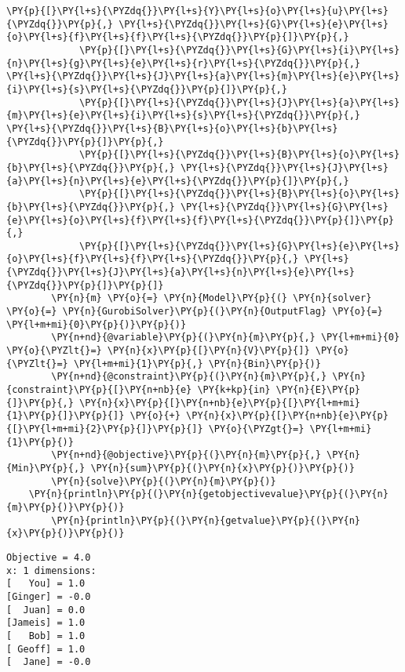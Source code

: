 \begin{Verbatim}[commandchars=\\\{\}]
             \PY{p}{[}\PY{l+s}{\PYZdq{}}\PY{l+s}{Y}\PY{l+s}{o}\PY{l+s}{u}\PY{l+s}{\PYZdq{}}\PY{p}{,} \PY{l+s}{\PYZdq{}}\PY{l+s}{G}\PY{l+s}{e}\PY{l+s}{o}\PY{l+s}{f}\PY{l+s}{f}\PY{l+s}{\PYZdq{}}\PY{p}{]}\PY{p}{,}
             \PY{p}{[}\PY{l+s}{\PYZdq{}}\PY{l+s}{G}\PY{l+s}{i}\PY{l+s}{n}\PY{l+s}{g}\PY{l+s}{e}\PY{l+s}{r}\PY{l+s}{\PYZdq{}}\PY{p}{,} \PY{l+s}{\PYZdq{}}\PY{l+s}{J}\PY{l+s}{a}\PY{l+s}{m}\PY{l+s}{e}\PY{l+s}{i}\PY{l+s}{s}\PY{l+s}{\PYZdq{}}\PY{p}{]}\PY{p}{,}
             \PY{p}{[}\PY{l+s}{\PYZdq{}}\PY{l+s}{J}\PY{l+s}{a}\PY{l+s}{m}\PY{l+s}{e}\PY{l+s}{i}\PY{l+s}{s}\PY{l+s}{\PYZdq{}}\PY{p}{,} \PY{l+s}{\PYZdq{}}\PY{l+s}{B}\PY{l+s}{o}\PY{l+s}{b}\PY{l+s}{\PYZdq{}}\PY{p}{]}\PY{p}{,}
             \PY{p}{[}\PY{l+s}{\PYZdq{}}\PY{l+s}{B}\PY{l+s}{o}\PY{l+s}{b}\PY{l+s}{\PYZdq{}}\PY{p}{,} \PY{l+s}{\PYZdq{}}\PY{l+s}{J}\PY{l+s}{a}\PY{l+s}{n}\PY{l+s}{e}\PY{l+s}{\PYZdq{}}\PY{p}{]}\PY{p}{,}
             \PY{p}{[}\PY{l+s}{\PYZdq{}}\PY{l+s}{B}\PY{l+s}{o}\PY{l+s}{b}\PY{l+s}{\PYZdq{}}\PY{p}{,} \PY{l+s}{\PYZdq{}}\PY{l+s}{G}\PY{l+s}{e}\PY{l+s}{o}\PY{l+s}{f}\PY{l+s}{f}\PY{l+s}{\PYZdq{}}\PY{p}{]}\PY{p}{,}
             \PY{p}{[}\PY{l+s}{\PYZdq{}}\PY{l+s}{G}\PY{l+s}{e}\PY{l+s}{o}\PY{l+s}{f}\PY{l+s}{f}\PY{l+s}{\PYZdq{}}\PY{p}{,} \PY{l+s}{\PYZdq{}}\PY{l+s}{J}\PY{l+s}{a}\PY{l+s}{n}\PY{l+s}{e}\PY{l+s}{\PYZdq{}}\PY{p}{]}\PY{p}{]}
        \PY{n}{m} \PY{o}{=} \PY{n}{Model}\PY{p}{(} \PY{n}{solver} \PY{o}{=} \PY{n}{GurobiSolver}\PY{p}{(}\PY{n}{OutputFlag} \PY{o}{=} \PY{l+m+mi}{0}\PY{p}{)}\PY{p}{)}
        \PY{n+nd}{@variable}\PY{p}{(}\PY{n}{m}\PY{p}{,} \PY{l+m+mi}{0} \PY{o}{\PYZlt{}=} \PY{n}{x}\PY{p}{[}\PY{n}{V}\PY{p}{]} \PY{o}{\PYZlt{}=} \PY{l+m+mi}{1}\PY{p}{,} \PY{n}{Bin}\PY{p}{)}
        \PY{n+nd}{@constraint}\PY{p}{(}\PY{n}{m}\PY{p}{,} \PY{n}{constraint}\PY{p}{[}\PY{n+nb}{e} \PY{k+kp}{in} \PY{n}{E}\PY{p}{]}\PY{p}{,} \PY{n}{x}\PY{p}{[}\PY{n+nb}{e}\PY{p}{[}\PY{l+m+mi}{1}\PY{p}{]}\PY{p}{]} \PY{o}{+} \PY{n}{x}\PY{p}{[}\PY{n+nb}{e}\PY{p}{[}\PY{l+m+mi}{2}\PY{p}{]}\PY{p}{]} \PY{o}{\PYZgt{}=} \PY{l+m+mi}{1}\PY{p}{)}
        \PY{n+nd}{@objective}\PY{p}{(}\PY{n}{m}\PY{p}{,} \PY{n}{Min}\PY{p}{,} \PY{n}{sum}\PY{p}{(}\PY{n}{x}\PY{p}{)}\PY{p}{)}
        \PY{n}{solve}\PY{p}{(}\PY{n}{m}\PY{p}{)}
	\PY{n}{println}\PY{p}{(}\PY{n}{getobjectivevalue}\PY{p}{(}\PY{n}{m}\PY{p}{)}\PY{p}{)}
        \PY{n}{println}\PY{p}{(}\PY{n}{getvalue}\PY{p}{(}\PY{n}{x}\PY{p}{)}\PY{p}{)}
\end{Verbatim}


    \begin{Verbatim}[commandchars=\\\{\}]
Objective = 4.0
x: 1 dimensions:
[   You] = 1.0
[Ginger] = -0.0
[  Juan] = 0.0
[Jameis] = 1.0
[   Bob] = 1.0
[ Geoff] = 1.0
[  Jane] = -0.0
    \end{Verbatim}




    
    
    
